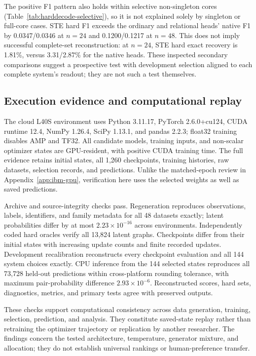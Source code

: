 The positive F1 pattern also holds within selective non-singleton cores (Table~\ref{tab:harddecode-selective}), so it is not explained solely by singleton or full-core cases. STE hard F1 exceeds the ordinary and relational heads' native F1 by 0.0347/0.0346 at $n=24$ and 0.1200/0.1217 at $n=48$. This does not imply successful complete-set reconstruction: at $n=24$, STE hard exact recovery is 1.81\%, versus 3.31/2.87\% for the native heads. These inspected secondary comparisons suggest a prospective test with development selection aligned to each complete system's readout; they are not such a test themselves.

\subsection{Execution evidence and computational replay}
The cloud L40S environment uses Python 3.11.17, PyTorch 2.6.0+cu124, CUDA runtime 12.4, NumPy 1.26.4, SciPy 1.13.1, and pandas 2.2.3; float32 training disables AMP and TF32. All candidate models, training inputs, and non-scalar optimizer states are GPU-resident, with positive CUDA training time. The full evidence retains initial states, all 1,260 checkpoints, training histories, raw datasets, selection records, and predictions. Unlike the matched-epoch review in Appendix~\ref{app:ibm-gpu}, verification here uses the selected weights as well as saved predictions.

Archive and source-integrity checks pass. Regeneration reproduces observations, labels, identifiers, and family metadata for all 48 datasets exactly; latent probabilities differ by at most $2.23\times10^{-16}$ across environments. Independently coded hard oracles verify all 13,824 latent graphs. Checkpoints differ from their initial states with increasing update counts and finite recorded updates. Development recalibration reconstructs every checkpoint evaluation and all 144 system choices exactly. CPU inference from the 144 selected states reproduces all 73,728 held-out predictions within cross-platform rounding tolerance, with maximum pair-probability difference $2.93\times10^{-6}$. Reconstructed scores, hard sets, diagnostics, metrics, and primary tests agree with preserved outputs.

These checks support computational consistency across data generation, training, selection, prediction, and analysis. They constitute saved-state replay rather than retraining the optimizer trajectory or replication by another researcher. The findings concern the tested architecture, temperature, generator mixture, and allocation; they do not establish universal rankings or human-preference transfer.
